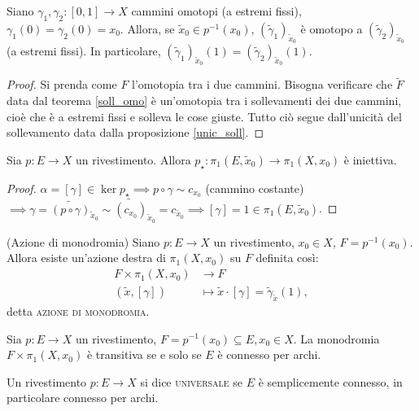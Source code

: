 \begin{cor}
  Siano $\gamma_1, \gamma_2:[0, 1] \rightarrow X$ cammini omotopi (a estremi fissi), $\gamma_1(0)=\gamma_2(0)=x_0$.
  Allora, se $\tilde{x}_0 \in p^{-1}(x_0)$, $(\tilde{\gamma}_1)_{\tilde{x}_0}$ è omotopo a $(\tilde{\gamma}_2)_{\tilde{x}_0}$ (a estremi fissi).
  In particolare, $(\tilde{\gamma}_1)_{\tilde{x}_0}(1)=(\tilde{\gamma}_2)_{\tilde{x}_0}(1)$.
\end{cor}

\begin{proof}
  Si prenda come $F$ l'omotopia tra i due cammini. Bisogna verificare che $\tilde{F}$ data dal teorema \ref{soll_omo} è un'omotopia tra i sollevamenti dei due cammini, cioè che è a estremi fissi e solleva le cose giuste. Tutto ciò segue dall'unicità del sollevamento data dalla proposizione \ref{unic_soll}.
\end{proof}

\begin{cor}
  Sia $p:E \rightarrow X$ un rivestimento. Allora $p_{\star}:\pi_1(E, \tilde{x}_0) \rightarrow \pi_1(X, x_0)$ è iniettiva.
\end{cor}

\begin{proof}
  $\alpha=[\gamma] \in \ker{p_{\star}} \implies p \circ \gamma \sim c_{x_0}$ (cammino costante)
  $\implies \gamma=\widetilde{(p \circ \gamma)}_{\tilde{x}_0} \sim \widetilde{(c_{x_0})}_{\tilde{x}_0}=c_{\tilde{x}_0} \implies [\gamma]=1 \in \pi_1(E, \tilde{x}_0)$.
\end{proof}

\begin{defn}
  (Azione di monodromia) Siano $p:E \rightarrow X$ un rivestimento, $x_0 \in X$, $F=p^{-1}(x_0)$. Allora esiste un'azione destra di $\pi_1(X, x_0)$ su $F$ definita così:
  \begin{align*}
    F \times \pi_1(X, x_0) &\longrightarrow F \\
    (\tilde{x}, [\gamma]) &\longmapsto \tilde{x} \cdot [\gamma]=\tilde{\gamma}_{\tilde{x}}(1),
  \end{align*}
  detta \textsc{azione di monodromia}.
\end{defn}

\begin{oss}
  Sia $p:E \rightarrow X$ un rivestimento, $F=p^{-1}(x_0) \subseteq E, x_0 \in X$. La monodromia $F \times \pi_1(X, x_0)$ è transitiva se e solo se $E$ è connesso per archi.
\end{oss}

\begin{defn}
  Un rivestimento $p:E \rightarrow X$ si dice \textsc{universale} se $E$ è semplicemente connesso, in particolare connesso per archi.
\end{defn}

